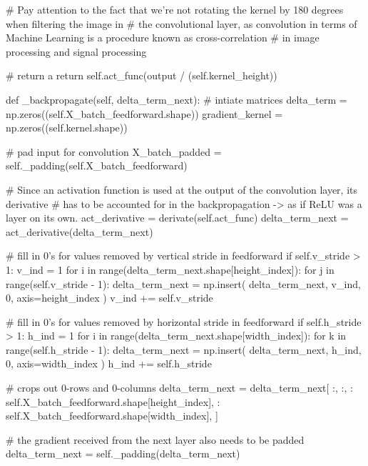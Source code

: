 \documentclass[%
oneside,                 %
final,                   %
10pt]{article}
\begin{document}
        # Pay attention to the fact that we're not rotating the kernel by 180 degrees when filtering the image in
        # the convolutional layer, as convolution in terms of Machine Learning is a procedure known as cross-correlation
        # in image processing and signal processing

        # return a
        return self.act_func(output / (self.kernel_height))

    def _backpropagate(self, delta_term_next):
        # intiate matrices
        delta_term = np.zeros((self.X_batch_feedforward.shape))
        gradient_kernel = np.zeros((self.kernel.shape))

        # pad input for convolution
        X_batch_padded = self._padding(self.X_batch_feedforward)

        # Since an activation function is used at the output of the convolution layer, its derivative
        # has to be accounted for in the backpropagation -> as if ReLU was a layer on its own.
        act_derivative = derivate(self.act_func)
        delta_term_next = act_derivative(delta_term_next)

        # fill in 0's for values removed by vertical stride in feedforward
        if self.v_stride > 1:
            v_ind = 1
            for i in range(delta_term_next.shape[height_index]):
                for j in range(self.v_stride - 1):
                    delta_term_next = np.insert(
                        delta_term_next, v_ind, 0, axis=height_index
                    )
                v_ind += self.v_stride

        # fill in 0's for values removed by horizontal stride in feedforward
        if self.h_stride > 1:
            h_ind = 1
            for i in range(delta_term_next.shape[width_index]):
                for k in range(self.h_stride - 1):
                    delta_term_next = np.insert(
                        delta_term_next, h_ind, 0, axis=width_index
                    )
                h_ind += self.h_stride

        # crops out 0-rows and 0-columns
        delta_term_next = delta_term_next[
            :,
            :,
            : self.X_batch_feedforward.shape[height_index],
            : self.X_batch_feedforward.shape[width_index],
        ]

        # the gradient received from the next layer also needs to be padded
        delta_term_next = self._padding(delta_term_next)
\end{document}
